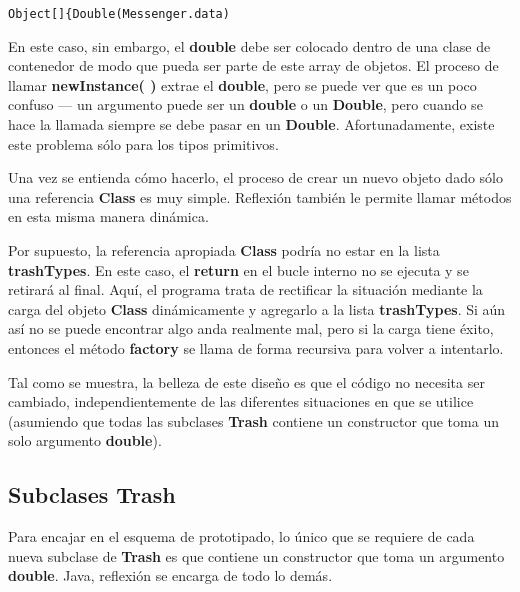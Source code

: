 \begin{lstlisting} 
Object[]{Double(Messenger.data)
\end{lstlisting}

En este caso, sin embargo, el \textbf{double} debe ser colocado dentro de una clase de contenedor de modo que pueda ser parte de este array de objetos. El proceso de llamar \textbf{newInstance( )} extrae el \textbf{double}, pero se puede ver que es un poco confuso — un argumento puede ser un \textbf{double} o un \textbf{Double}, pero cuando se hace la llamada siempre se debe pasar en un \textbf{Double}. Afortunadamente, existe este problema sólo para los tipos primitivos.   \newline

Una vez se entienda cómo hacerlo, el proceso de crear un nuevo objeto dado sólo una referencia \textbf{Class} es muy simple. Reflexión también le permite llamar métodos en esta misma manera dinámica.      \newline

Por supuesto, la referencia apropiada \textbf{Class} podría no estar en la lista \textbf{trashTypes}. En este caso, el \textbf{return} en el bucle interno no se ejecuta y se retirará al final. Aquí, el programa trata de rectificar la situación mediante la carga del objeto \textbf{Class} dinámicamente y agregarlo a la lista \textbf{trashTypes}. Si aún así no se puede encontrar algo anda realmente mal, pero si la carga tiene éxito, entonces el método  \textbf{factory} se llama de forma recursiva para volver a intentarlo.    \newline

Tal como se muestra, la belleza de este diseño es que el código no necesita ser cambiado, independientemente de las diferentes situaciones en que se utilice (asumiendo que todas las subclases \textbf{Trash} contiene un constructor que toma un solo argumento \textbf{double}).     \newline


\subsection*{Subclases \textbf{Trash}}
\label{subsec:st}


Para encajar en el esquema de prototipado, lo único que se requiere de cada nueva subclase de \textbf{Trash} es que contiene un constructor que toma un argumento \textbf{double}. Java, reflexión se encarga de todo lo demás.    \newline

